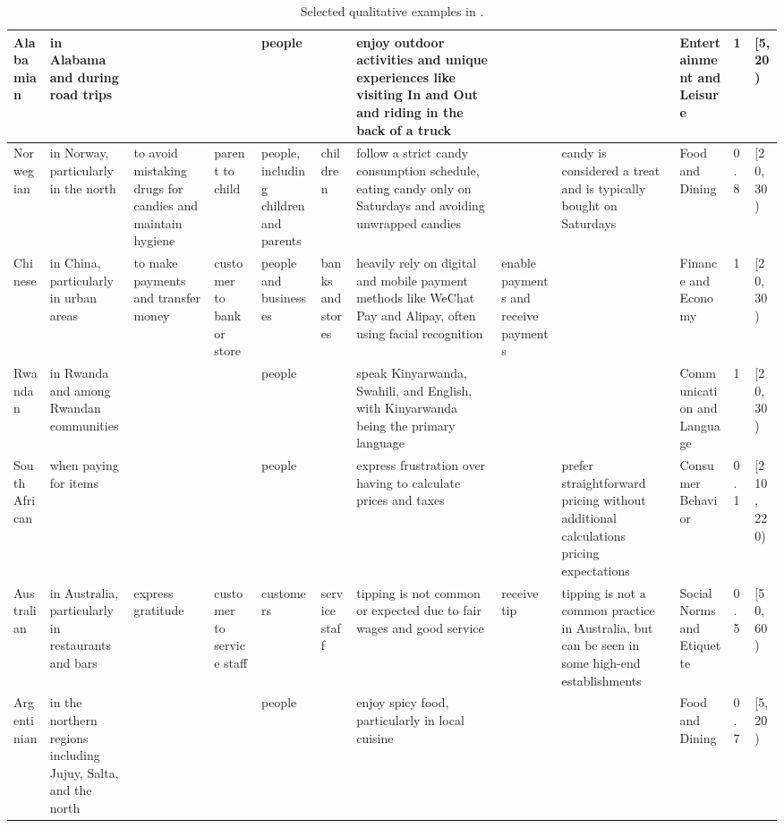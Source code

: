 \begin{table}[h]
{\begin{tabular}{p{2cm}|p{3cm}|p{2cm}|p{1.5cm}|p{2cm}|p{2cm}|p{4cm}|p{2cm}|p{4cm}|p{2cm}|p{1cm}|p{2cm}}
 Alabamian &	in Alabama and during road trips	&&&		people&&		enjoy outdoor activities and unique experiences like visiting In and Out and riding in the back of a truck &&&			Entertainment and Leisure	&	1	&[5, 20) \\\midrule
Norwegian&	in Norway, particularly in the north &	to avoid mistaking drugs for candies and maintain hygiene &	parent to child&	people, including children and parents&	children &	follow a strict candy consumption schedule, eating candy only on Saturdays and avoiding unwrapped candies	&&	candy is considered a treat and is typically bought on Saturdays&	Food and Dining &	0.8&	[20, 30)\\
\midrule
Chinese	&in China, particularly in urban areas &	to make payments and transfer money&	customer to bank or store&	people and businesses&	banks and stores&	heavily rely on digital and mobile payment methods like WeChat Pay and Alipay, often using facial recognition&	enable payments and receive payments&&		Finance and Economy& 1	&[20, 30)\\
\midrule

Rwandan&	in Rwanda and among Rwandan communities&&&			people&&		speak Kinyarwanda, Swahili, and English, with Kinyarwanda being the primary language&	&&		Communication and Language& 1	&[20, 30)\\
\midrule
South African &	when paying for items	&&&		people	&&	express frustration over having to calculate prices and taxes	&&	prefer straightforward pricing without additional calculations	pricing expectations& Consumer Behavior&	0.1	&[210, 220) \\
\midrule

Australian &	in Australia, particularly in restaurants and bars&	express gratitude&	customer to service staff&	customers&	service staff&	tipping is not common or expected due to fair wages and good service&	receive tip&	tipping is not a common practice in Australia, but can be seen in some high-end establishments&	Social Norms and Etiquette&	0.5	& [50, 60) \\\midrule
Argentinian&	in the northern regions including Jujuy, Salta, and the north&&&			people&	&	enjoy spicy food, particularly in local cuisine&			&&	Food and Dining  & 0.7	&[5, 20)	\\%
 \bottomrule
\end{tabular}
}
\caption{Selected qualitative examples in \dataname. } %
\label{tab:data examples}
\end{table}
